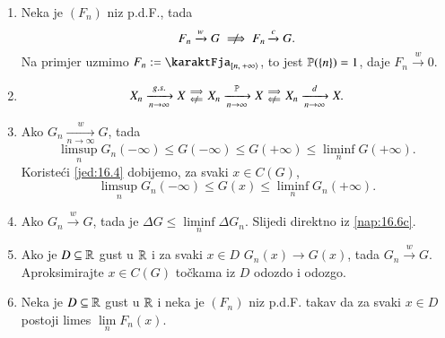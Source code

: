 \begin{nap} \label{nap:16.6}
    \begin{enumerate}[label=(\alph*)]
        \item Neka je $(F_n)$ niz p.d.F., tada
        \begin{equation*}
            F_n \xrightarrow{w} G \centernot\implies F_n \xrightarrow{c} G.
        \end{equation*}
        Na primjer uzmimo $F_n := \karaktFja_{\desInt{n}{+\infty}}$, to jest $\mathbb{P}(\{n\}) = 1$, daje $F_n \xrightarrow{w} 0$.
        \item
        \begin{equation*}
            X_n \xrightarrow[n \to \infty]{g.s.} X
            \begin{smallmatrix}
                \implies\\
                \notimpliedby
            \end{smallmatrix}
            X_n \xrightarrow[n \to \infty]{\masP} X
            \begin{smallmatrix}
                \implies\\
                \notimpliedby
            \end{smallmatrix}
            X_n \xrightarrow[n \to \infty]{d} X.
        \end{equation*}
        \item   \label{nap:16.6c}
        Ako $G_n \xrightarrow[n \to \infty]{w} G$, tada
            \begin{equation*}
                \limsup\limits_n G_n(-\infty) \leq G(-\infty) \leq G(+ \infty) \leq \liminf\limits_n G(+\infty).
            \end{equation*}
            Koriste\' ci \eqref{jed:16.4} dobijemo, za svaki $x \in C(G)$,
            \begin{equation*}
                \limsup\limits_n G_n (-\infty) \leq G(x) \leq \liminf\limits_n G_n (+\infty).
            \end{equation*}
        \item   \label{nap:16.6d}
        Ako $G_n \xrightarrow{w} G$, tada je $\Delta G \leq \liminf\limits_n \Delta G_n$.
        Slijedi direktno iz \ref{nap:16.6c}.
        \item   \label{nap:16.6e}
        Ako je $D \subseteq \mathbb{R}$ gust u $\mathbb{R}$ i za svaki $x \in D$ $G_n (x) \xrightarrow{} G (x)$, tada $G_n \xrightarrow{w} G$.
        Aproksimirajte $x \in C(G)$ to\v ckama iz $D$ odozdo i odozgo.
        \item Neka je $D \subseteq \mathbb{R}$ gust u $\mathbb{R}$ i neka je $(F_n)$ niz p.d.F. takav da za svaki $x \in D$ postoji limes $\lim\limits_n F_n (x)$.

\end{enumerate}
\end{nap}
